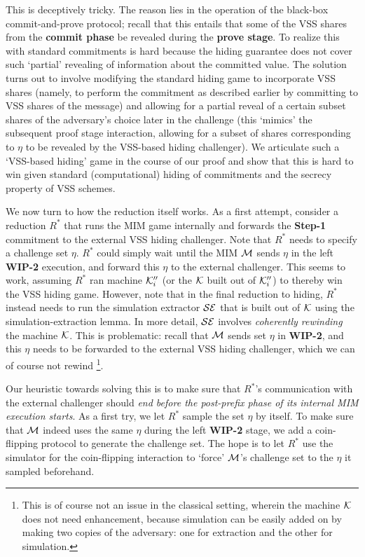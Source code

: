 This is deceptively tricky. The reason lies in the operation of the black-box commit-and-prove protocol; recall that this entails that some of the VSS shares from the {\bf commit phase} be revealed during the {\bf prove stage}. To realize this with standard commitments is hard because the hiding guarantee does not cover such `partial' revealing of information about the committed value. The solution turns out to involve modifying the standard hiding game to incorporate VSS shares (namely, to perform the commitment as described earlier by committing to VSS shares of the message) and allowing for a partial reveal of a certain subset shares of the adversary's choice later in the challenge (this `mimics' the subsequent proof stage interaction, allowing for a subset of shares corresponding to $\eta$ to be revealed by the VSS-based hiding challenger). We articulate such a `VSS-based hiding' game in the course of our proof and show that this is hard to win given standard (computational) hiding of commitments and the secrecy property of VSS schemes.

We now turn to how the reduction itself works. As a first attempt, consider a reduction $R^*$ that runs the MIM game internally and forwards the {\bf Step-1} commitment to the external VSS hiding challenger. Note that $R^*$ needs to specify a challenge set $\eta$. $R^*$ could simply wait until the MIM $\mathcal{M}$ sends $\eta$ in the left {\bf WIP-2} execution, and forward this $\eta$ to the external challenger. This seems to work, assuming $R^*$ ran machine $\mathcal{K}''_i$ (or the $\mathcal{K}$ built out of $\mathcal{K}''_i$) to thereby win the VSS hiding game. However, note that in the final reduction to hiding, $R^*$ instead needs to run the simulation extractor $\mathcal{SE}$ that is built out of $\mathcal{K}$ using the \cite{FOCS:LPY23} simulation-extraction lemma. In more detail, $\mathcal{SE}$ involves {\em coherently rewinding} the machine $\mathcal{K}$. This is problematic: recall that $\mathcal{M}$ sends set $\eta$ in {\bf WIP-2}, and this $\eta$ needs to be forwarded to the external VSS hiding challenger, which we can of course not rewind \footnote{This is of course not an issue in the classical setting, wherein the machine $\mathcal{K}$ does not need enhancement, because simulation can be easily added on by making two copies of the adversary: one for extraction and the other for simulation.}. 

Our heuristic towards solving this is to make sure that $R^*$'s communication with the external challenger should {\em end before the post-prefix phase of its internal MIM execution starts}. As a first try, we let $R^*$ sample the set $\eta$ by itself. To make sure that $\mathcal{M}$ indeed uses the same $\eta$ during the left {\bf WIP-2} stage, we add a coin-flipping protocol to generate the challenge set. The hope is to let $R^*$ use the simulator for the coin-flipping interaction to `force' $\mathcal{M}$'s challenge set to the $\eta$ it sampled beforehand.

